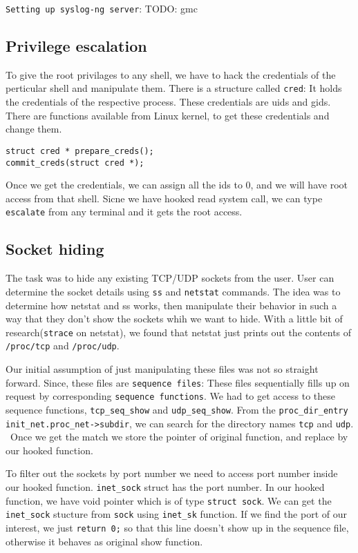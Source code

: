 \documentclass[10pt, letterpaper]{scrartcl}
\begin{document}
\texttt{Setting up syslog-ng server}: TODO: gmc 

\subsection{Privilege escalation}
To give the root privilages to any shell, we have to hack the credentials of the perticular shell and 
manipulate them. There is a structure called \texttt{cred}: 
It holds the credentials of the respective process. These credentials are uids and gids. 
There are functions available from Linux kernel, to get these credentials and change them. 

\begin{verbatim}
struct cred * prepare_creds();
commit_creds(struct cred *);
\end{verbatim}

Once we get the credentials, we can assign all the ids to 0, and we will have root access from that shell. 
Sicne we have hooked read system call, 
we can type \texttt{escalate} from any terminal and it gets the root access. 

\subsection{Socket hiding}
The task was to hide any existing TCP/UDP sockets from the user. 
User can determine the socket details using \texttt{ss} and \texttt{netstat} commands.
The idea was to determine how netstat and ss works, 
then manipulate their behavior in such a way that they don't show the sockets whih we want to hide. 
With a little bit of research(\texttt{strace} on netstat), 
we found that netstat just prints out the contents of \texttt{/proc/tcp} and \texttt{/proc/udp}.

Our initial assumption of just manipulating these files was not so straight forward. 
Since, these files are \texttt{sequence files}: 
These files sequentially fills up on request by corresponding \texttt{sequence functions}. 
We had to get access to these sequence functions, \texttt{tcp\_seq\_show} and \texttt{udp\_seq\_show}. 
From the \texttt{proc\_dir\_entry} \texttt{init\_net.proc\_net->subdir}, 
we can search for the directory names \texttt{tcp} and \texttt{udp}. \
Once we get the match we store the pointer of original function, and replace by our hooked function. 

To filter out the sockets by port number we need to access port number inside our hooked function. 
\texttt{inet\_sock} struct has the port number. 
In our hooked function, we have void pointer which is of type \texttt{struct sock}. 
We can get the \texttt{inet\_sock} stucture from \texttt{sock} using \texttt{inet\_sk} function. 
If we find the port of our interest, we just \texttt{return 0;} so that this line doesn't show up in the 
sequence file, otherwise it behaves as original show function. 
\end{document}
